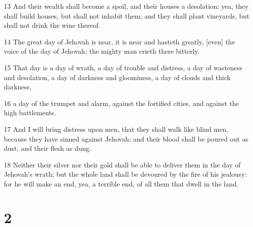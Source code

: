 \par 13 And their wealth shall become a spoil, and their houses a desolation: yea, they shall build houses, but shall not inhabit them; and they shall plant vineyards, but shall not drink the wine thereof.
\par 14 The great day of Jehovah is near, it is near and hasteth greatly, [even] the voice of the day of Jehovah; the mighty man crieth there bitterly.
\par 15 That day is a day of wrath, a day of trouble and distress, a day of wasteness and desolation, a day of darkness and gloominess, a day of clouds and thick darkness,
\par 16 a day of the trumpet and alarm, against the fortified cities, and against the high battlements.
\par 17 And I will bring distress upon men, that they shall walk like blind men, because they have sinned against Jehovah; and their blood shall be poured out as dust, and their flesh as dung.
\par 18 Neither their silver nor their gold shall be able to deliver them in the day of Jehovah's wrath; but the whole land shall be devoured by the fire of his jealousy: for he will make an end, yea, a terrible end, of all them that dwell in the land.

\chapter{2}

